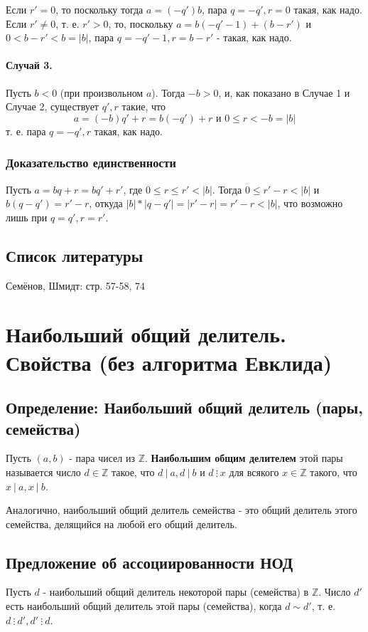 \documentclass{article}
\newcommand{\divs}{~\vdots~}
\begin{document}
Если $r' = 0$, то поскольку тогда $a = (-q')b$, пара $q = -q', r = 0$ такая, как надо. Если $r' \neq 0$, т. е. $r' > 0$, то, поскольку $a = b(-q' - 1) + (b - r')$ и $0 < b-r' < b = |b|$, пара $q = -q'-1, r = b - r'$ - такая, как надо.

\paragraph{Случай 3.}
Пусть $b < 0$ (при произвольном $a$). Тогда $-b > 0$, и, как показано в Случае 1 и Случае 2, существует $q', r$ такие, что 
\[a = (-b)q' + r = b(-q') + r \text{ и } 0 \leq r < -b = |b|\]
т. е. пара $q = -q', r$ такая, как надо.

\subsubsection{Доказательство единственности}
Пусть $a = bq + r = bq' + r'$, где $0 \leq r \leq r' < |b|$. Тогда $0 \leq r'-r < |b|$ и $b(q-q') = r'-r$, откуда $|b| * |q-q'| = |r' - r| = r' - r < |b|$, что возможно лишь при $q = q', r = r'$.

\subsection*{Список литературы}
Семёнов, Шмидт: стр. 57-58, 74


\newpage
\section{Наибольший общий делитель. Свойства (без алгоритма Евклида)}
\subsection{Определение: Наибольший общий делитель (пары, семейства)}
Пусть $(a, b)$ - пара чисел из $\mathbb Z$. \textbf{Наибольшим общим делителем} этой пары называется число $d \in \mathbb Z$ такое, что $d~\vert~a, d~\vert~b$ и $d \divs x$ для всякого $x \in \mathbb Z$ такого, что $x~\vert~a, x~\vert~b$.

Аналогично, наибольший общий делитель семейства - это общий делитель этого семейства, делящийся на любой его общий делитель.

\subsection{Предложение об ассоциированности НОД}
Пусть $d$ - наибольший общий делитель некоторой пары (семейства) в $\mathbb Z$. Число $d'$ есть наибольший общий делитель этой пары (семейства), когда $d \sim d'$, т. е. $d \divs d', d' \divs d$.
\end{document}
